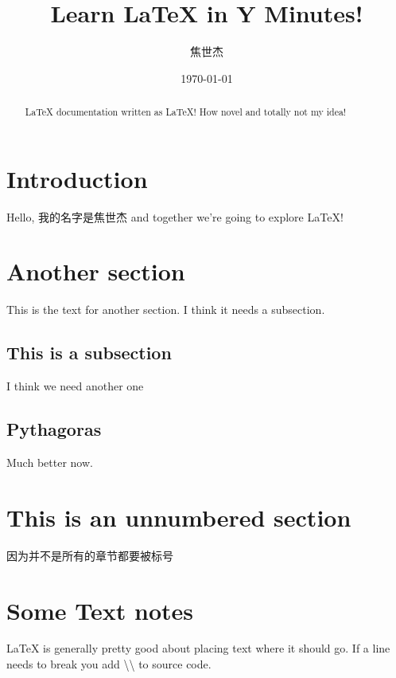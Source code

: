 \documentclass[fontset=adobe, 12pt]{article}
\author{焦世杰}
\date{\today}
\title{Learn \LaTeX \hspace{1pt} in Y Minutes!}
\begin{document}
\maketitle
\newpage  %
\tableofcontents  %

\newpage

\begin{abstract}
  \LaTeX \hspace{1pt} documentation written as \LaTeX! How novel and totally not my idea!

\end{abstract}

\section{Introduction}
Hello, 我的名字是焦世杰 and together we're going to explore \LaTeX!

\section{Another section}
This is the text for another section. I think it needs a subsection.

\subsection{This is a subsection}
I think we need another one

\subsection{Pythagoras}
Much better now.
\label{subsec:pythagoras}

\section*{This is an unnumbered section}
因为并不是所有的章节都要被标号

\section{Some Text notes}
\LaTeX \hspace{1pt} is generally pretty good about placing text where it should go. If a line needs to break you add \textbackslash\textbackslash \hspace{1pt} to source code.
\end{document}
